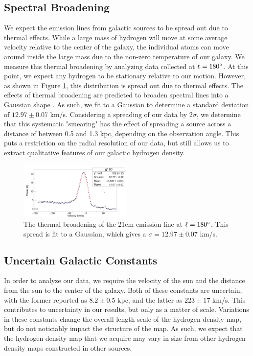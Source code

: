 \subsection{Spectral Broadening}
We expect the emission lines from galactic sources to be spread out due to thermal effects. While a large mass of hydrogen will move at some average velocity relative to the center of the galaxy, the individual atoms can move around inside the large mass due to the non-zero temperature of our galaxy. We measure this thermal broadening by analyzing data collected at $\ell=180\degree$. At this point, we expect any hydrogen to be stationary relative to our motion. However, as shown in Figure \ref{thermal}, this distribution is spread out due to thermal effects. The effects of thermal broadening are predicted to broaden spectral lines into a Gaussian shape \cite{thermal-spread}. As such, we fit to a Gaussian to determine a standard deviation of $12.97 \pm 0.07$ km/s. Considering a spreading of our data by $2\sigma$, we determine that this systematic "smearing" has the effect of spreading a source across a distance of between 0.5 and 1.3 kpc, depending on the observation angle. This puts a restriction on the radial resolution of our data, but still allows us to extract qualitative features of our galactic hydrogen density.

\begin{figure}
  \includegraphics[width=0.5\textwidth]{thermal_large}
  \caption{The thermal broadening of the 21cm emission line at $\ell=180\degree$. This spread is fit to a Gaussian, which gives a $\sigma = 12.97 \pm 0.07$ km/s.}
  \label{thermal}
\end{figure}

\subsection{Uncertain Galactic Constants}

In order to analyze our data, we require the velocity of the sun and the distance from the sun to the center of the galaxy. Both of these constants are uncertain, with the former reported as $8.2 \pm 0.5$ kpc, and the latter as $223 \pm 17$ km/s. This contributes to uncertainty in our results, but only as a matter of scale. Variations in these constants change the overall length scale of the hydrogen density map, but do not noticiably impact the structure of the map. As such, we expect that the hydrogen density map that we acquire may vary in size from other hydrogen density maps constructed in other sources.

